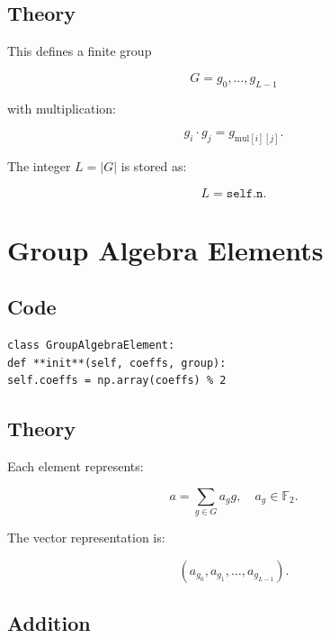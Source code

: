 \documentclass[11pt]{article}
\begin{document}
\subsection{Theory}

This defines a finite group

\begin{equation}
G = {g_0, \dots, g_{L-1}}
\end{equation}

with multiplication:

\begin{equation}
g_i \cdot g_j = g_{\text{mul}[i][j]}.
\end{equation}

The integer $L = |G|$ is stored as:

\begin{equation}
L = \texttt{self.n}.
\end{equation}

\section{Group Algebra Elements}

\subsection{Code}
\begin{verbatim}
class GroupAlgebraElement:
def **init**(self, coeffs, group):
self.coeffs = np.array(coeffs) % 2
\end{verbatim}

\subsection{Theory}

Each element represents:

\begin{equation}
a = \sum_{g \in G} a_g g, \quad a_g \in \mathbb{F}_2.
\end{equation}

The vector representation is:

\begin{equation}
(a_{g_0}, a_{g_1}, \dots, a_{g_{L-1}}).
\end{equation}

\subsection{Addition}
\end{document}
